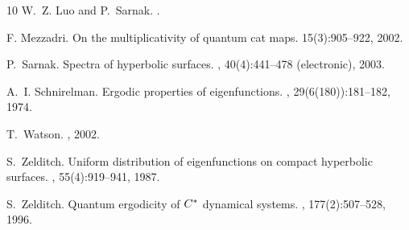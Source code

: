 \documentclass[12pt]{amsart}
\theoremstyle{plain}
\renewcommand{\^}{\widehat}
\begin{document}
\begin{thebibliography}{10}
W.~Z. Luo and P.~Sarnak.
.

F. Mezzadri.  
\newblock On the multiplicativity of quantum cat maps. 
 15(3):905--922,  2002. 

P.~Sarnak.
\newblock Spectra of hyperbolic surfaces.
, 40(4):441--478 (electronic),
  2003.

A.~I. Schnirelman.
\newblock Ergodic properties of eigenfunctions.
, 29(6(180)):181--182, 1974.

T.~Watson.
, 2002.

S.~Zelditch.
\newblock Uniform distribution of eigenfunctions on compact hyperbolic
  surfaces.
, 55(4):919--941, 1987.

S.~Zelditch.
\newblock Quantum ergodicity of ${C}\sp *$ dynamical systems.
, 177(2):507--528, 1996.

\end{thebibliography}
\end{document}

